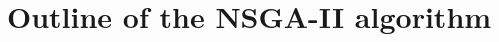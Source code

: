 \section[Outline of the NSGA-II algorithm]{\label{identificadorReferenciaCruzada}
Outline of the NSGA-II algorithm}
